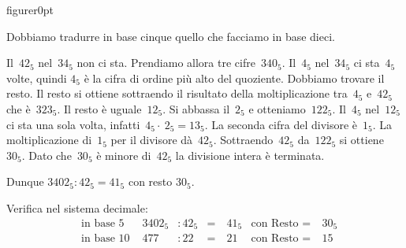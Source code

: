 \begin{exrig}
\begin{wrapfloat}{figure}{r}{0pt}
 
\end{wrapfloat}
Dobbiamo tradurre in base cinque quello che facciamo in base dieci.

Il~$42_5$ nel~$34_5$ non ci sta. Prendiamo allora tre cifre~$340_5$. Il~$4_5$
nel~$34_5$ ci sta~$4_5$ volte, quindi $4_5$ è la cifra di ordine più alto
del quoziente. Dobbiamo trovare il resto. Il resto si ottiene
sottraendo il risultato della moltiplicazione tra~$4_5$ e~$42_5$ che è~$323_5$.
Il resto è uguale~$12_5$.
Si abbassa il~$2_5$ e otteniamo~$122_5$. Il~$4_5$ nel~$12_5$ ci
sta una sola volta, infatti~$4_5\cdot~2_5=13_5$. La seconda cifra del
divisore è~$1_5$.
La moltiplicazione di~$1_5$ per il divisore dà~$42_5$. Sottraendo~$42_5$
da~$122_5$ si ottiene~$30_5$. Dato che~$30_5$ è minore di~$42_5$ la
divisione intera è terminata.

Dunque $3402_{5}:42_{5} = 41_{5}$ con resto $30_{5}$.

Verifica nel sistema decimale: %
\begin{align*}
&\text{in base 5 }&3402_{5}&:42_{5}&=&~41_{5}&\text{con Resto }=&~30_{5}\\
&\text{in base 10 }&477&:22&=&~21&\text{con Resto }= &~15
\end{align*}
\end{exrig}

\ovalbox{\risolvii \ref{ese:4.30}, \ref{ese:4.31}}
\newpage

\cleardoublepage
